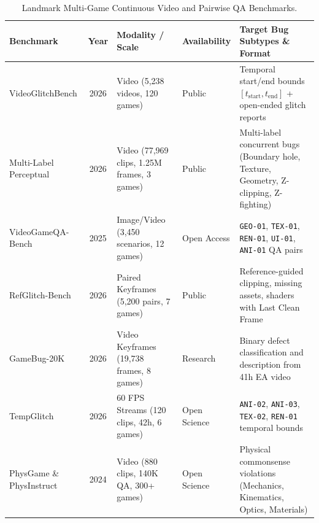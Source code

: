 \documentclass[preprint,12pt,3p]{elsarticle}
\begin{document}
\begin{table}[htbp]
\centering
\small
\caption{Landmark Multi-Game Continuous Video and Pairwise QA Benchmarks.}
\label{tab:benchmarks_video}
\begin{tabularx}{\textwidth}{lcp{3.8cm}lX}
\toprule
\textbf{Benchmark} & \textbf{Year} & \textbf{Modality / Scale} & \textbf{Availability} & \textbf{Target Bug Subtypes \& Format} \\
\midrule
VideoGlitchBench \cite{zheng2026glide} & 2026 & Video (5,238 videos, 120 games) & Public & Temporal start/end bounds $[t_{\text{start}}, t_{\text{end}}]$ + open-ended glitch reports \\
Multi-Label Perceptual \cite{rifaat2026multilabel} & 2026 & Video (77,969 clips, 1.25M frames, 3 games) & Public & Multi-label concurrent bugs (Boundary hole, Texture, Geometry, Z-clipping, Z-fighting) \\
VideoGameQA-Bench \cite{taesiri2025videogameqa} & 2025 & Image/Video (3,450 scenarios, 12 games) & Open Access & \texttt{GEO-01}, \texttt{TEX-01}, \texttt{REN-01}, \texttt{UI-01}, \texttt{ANI-01} QA pairs \\
RefGlitch-Bench \cite{yu2026refglitch} & 2026 & Paired Keyframes (5,200 pairs, 7 games) & Public & Reference-guided clipping, missing assets, shaders with Last Clean Frame \\
GameBug-20K \cite{lu2026howfarvlms} & 2026 & Video Keyframes (19,738 frames, 8 games) & Research & Binary defect classification and description from 41h EA video \\
TempGlitch \cite{muller2026tempglitch} & 2026 & 60 FPS Streams (120 clips, 42h, 6 games) & Open Science & \texttt{ANI-02}, \texttt{ANI-03}, \texttt{TEX-02}, \texttt{REN-01} temporal bounds \\
PhysGame \& PhysInstruct \cite{cao2024physgame} & 2024 & Video (880 clips, 140K QA, 300+ games) & Open Science & Physical commonsense violations (Mechanics, Kinematics, Optics, Materials) \\
\bottomrule
\end{tabularx}
\end{table}
\end{document}

